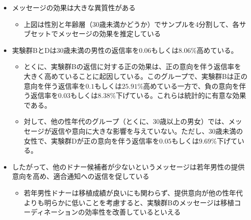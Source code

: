 \documentclass[
  a4paperpaper,
]{article}
\providecommand{\tightlist}{%
  \setlength{\itemsep}{0pt}\setlength{\parskip}{0pt}}\usepackage{longtable,booktabs,array}
\begin{document}
\begin{itemize}
\tightlist
\item
  メッセージの効果は大きな異質性がある

  \begin{itemize}
  \tightlist
  \item
    上図は性別と年齢層（30歳未満かどうか）でサンプルを4分割して、各サブセットでメッセージの効果を推定している
  \end{itemize}
\item
  実験群BとDは30歳未満の男性の返信率を\(0.06\)もしくは\(8.06\)\%高めている。

  \begin{itemize}
  \tightlist
  \item
    とくに、実験群Bの返信に対する正の効果は、正の意向を伴う返信率を大きく高めていることに起因している。このグループで、実験群Bは正の意向を伴う返信率を\(0.1\)もしくは\(25.91\)\%高めている一方で、負の意向を伴う返信率を\(0.03\)もしくは\(8.38\)\%下げている。これらは統計的に有意な効果である。
  \item
    対して、他の性年代のグループ（とくに、30歳以上の男女）では、メッセージが返信や意向に大きな影響を与えていない。ただし、30歳未満の女性で、実験群Dが正の意向を伴う返信率を\(0.05\)もしくは\(9.69\)\%下げている。
  \end{itemize}
\item
  したがって、他のドナー候補者が少ないというメッセージは若年男性の提供意向を高め、適合通知への返信を促している

  \begin{itemize}
  \tightlist
  \item
    若年男性ドナーは移植成績が良いにも関わらず、提供意向が他の性年代よりも明らかに低いことを考慮すると、実験群Bのメッセージは移植コーディネーションの効率性を改善しているといえる
  \end{itemize}
\end{itemize}
\end{document}
